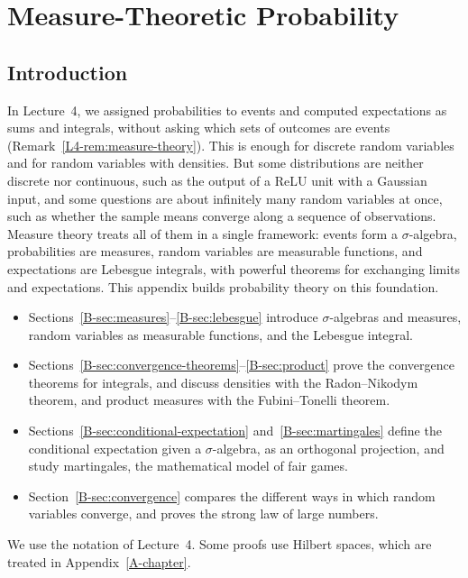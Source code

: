 \chapter{Measure-Theoretic Probability}\label{B-chapter}
\begingroup
\section*{Introduction}

In Lecture~4, we assigned probabilities to events and computed expectations as sums and integrals, without asking which sets of outcomes are events (Remark~\ref{L4-rem:measure-theory}). This is enough for discrete random variables and for random variables with densities. But some distributions are neither discrete nor continuous, such as the output of a ReLU unit with a Gaussian input, and some questions are about infinitely many random variables at once, such as whether the sample means converge along a sequence of observations. Measure theory treats all of them in a single framework: events form a $\sigma$-algebra, probabilities are measures, random variables are measurable functions, and expectations are Lebesgue integrals, with powerful theorems for exchanging limits and expectations. This appendix builds probability theory on this foundation.
\begin{itemize}
    \item Sections~\ref{B-sec:measures}--\ref{B-sec:lebesgue} introduce $\sigma$-algebras and measures, random variables as measurable functions, and the Lebesgue integral.
    \item Sections~\ref{B-sec:convergence-theorems}--\ref{B-sec:product} prove the convergence theorems for integrals, and discuss densities with the Radon--Nikodym theorem, and product measures with the Fubini--Tonelli theorem.
    \item Sections~\ref{B-sec:conditional-expectation} and~\ref{B-sec:martingales} define the conditional expectation given a $\sigma$-algebra, as an orthogonal projection, and study martingales, the mathematical model of fair games.
    \item Section~\ref{B-sec:convergence} compares the different ways in which random variables converge, and proves the strong law of large numbers.
\end{itemize}
We use the notation of Lecture~4. Some proofs use Hilbert spaces, which are treated in Appendix~\ref{A-chapter}.

